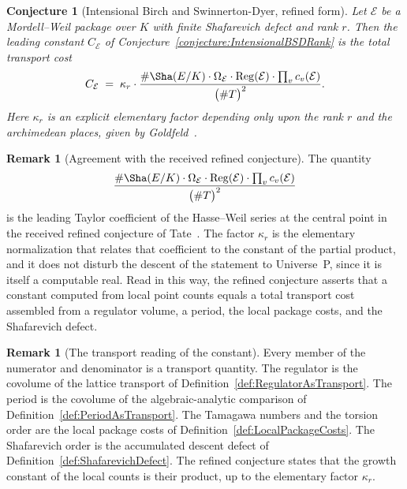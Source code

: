 \documentclass[10pt, reqno]{amsart}
\theoremstyle{plain}
\theoremstyle{definition}
\newtheorem{remark}[theorem]{Remark}
\theoremstyle{plain}
\newtheorem{conjecture}[theorem]{Conjecture}
\newcommand{\Reg}{\operatorname{Reg}}
\begin{document}
\begin{conjecture}[Intensional Birch and Swinnerton-Dyer, refined
form]\label{conjecture:IntensionalBSDRefined} Let $\mathcal{E}$ be a Mordell--Weil package over $K$ with finite Shafarevich defect and rank $r$. Then the leading constant $C_{\mathcal{E}}$ of Conjecture~\ref{conjecture:IntensionalBSDRank} is the total transport cost
\[
  C_{\mathcal{E}}
  \;=\;
  \kappa_r \cdot
  \frac{\# \Sha(E/K) \cdot \Omega_{\mathcal{E}} \cdot \Reg(\mathcal{E})
        \cdot \prod_{v} c_v(\mathcal{E})}
       {\bigl( \# T \bigr)^{2}}.
\]
Here $\kappa_r$ is an explicit elementary factor depending only upon the rank $r$ and the archimedean places, given by Goldfeld~\cite{Goldfeld1982}.
\end{conjecture}

\begin{remark}[Agreement with the received refined conjecture]\label{rem:RefinedClassicalForm}
The quantity
\[
  \frac{\# \Sha(E/K) \cdot \Omega_{\mathcal{E}} \cdot \Reg(\mathcal{E})
        \cdot \prod_{v} c_v(\mathcal{E})}{\bigl( \# T \bigr)^{2}}
\]
is the leading Taylor coefficient of the Hasse--Weil series at the central point in the received refined conjecture of Tate~\cite{Tate1966}. The factor $\kappa_r$ is the elementary normalization that relates that coefficient to the constant of the partial product, and it does not disturb the descent of the statement to Universe~P, since it is itself a computable real. Read in this way, the refined conjecture asserts that a constant computed from local point counts equals a total transport cost assembled from a regulator volume, a period, the local package costs, and the Shafarevich defect.
\end{remark}

\begin{remark}[The transport reading of the constant]\label{rem:TotalTransportReading}
Every member of the numerator and denominator is a transport quantity. The regulator is the covolume of the lattice transport of Definition~\ref{def:RegulatorAsTransport}. The period is the covolume of the algebraic-analytic comparison of Definition~\ref{def:PeriodAsTransport}. The Tamagawa numbers and the torsion order are the local package costs of Definition~\ref{def:LocalPackageCosts}. The Shafarevich order is the accumulated descent defect of Definition~\ref{def:ShafarevichDefect}. The refined conjecture states that the growth constant of the local counts is their product, up to the elementary factor $\kappa_r$.
\end{remark}
\end{document}
